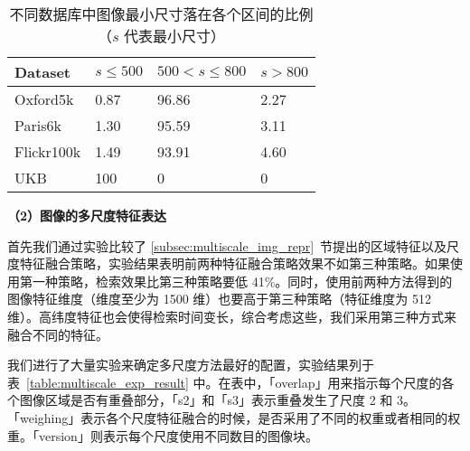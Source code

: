 \begin{table}[!t]
	\centering
	\caption[不同数据库中图像最小尺寸落在不同区间的比例]{不同数据库中图像最小尺寸落在各个区间的比例（$s$ 代表最小尺寸）}
	\label{table:min_size_distribution}
	\begin{tabular}{llll}
		\toprule
		Dataset & $s\leq 500$ & $500< s \leq 800$&  $s>800$ \\
		\midrule
		Oxford5k & 0.87 & 96.86 & 2.27 \\
		Paris6k & 1.30  & 95.59 & 3.11 \\
		Flickr100k & 1.49 & 93.91 & 4.60\\
		UKB & 100 & 0 & 0 \\
		\bottomrule
	\end{tabular}
	\end{table}

\noindent\textbf{（2）图像的多尺度特征表达}

首先我们通过实验比较了 \ref{subsec:multiscale_img_repr}~节提出的区域特征以及尺度特征融合策略，实验结果表明前两种特征融合策略效果不如第三种策略。如果使用第一种策略，检索效果比第三种策略要低 41\%。同时，使用前两种方法得到的图像特征维度（维度至少为 1500 维）也要高于第三种策略（特征维度为 512 维）。高纬度特征也会使得检索时间变长，综合考虑这些，我们采用第三种方式来融合不同的特征。

我们进行了大量实验来确定多尺度方法最好的配置，实验结果列于表~\ref{table:multiscale_exp_result} 中。在表中，「overlap」用来指示每个尺度的各个图像区域是否有重叠部分，「s2」和「s3」表示重叠发生了尺度 2 和 3。「weighing」表示各个尺度特征融合的时候，是否采用了不同的权重或者相同的权重。「version」则表示每个尺度使用不同数目的图像块。

